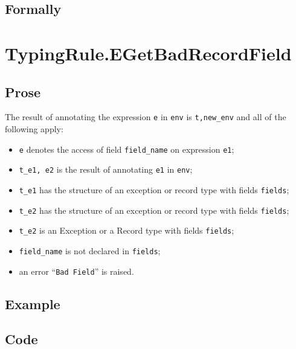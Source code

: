 \documentclass{book}
\begin{document}
\begin{emptyformal}
    \subsection{Formally}
\end{emptyformal}


\section{TypingRule.EGetBadRecordField \label{sec:TypingRule.EGetBadRecordField}}

  \subsection{Prose}
  The result of annotating the expression \texttt{e} in \texttt{env} is
\texttt{t,new\_env} and all of the following apply:
  \begin{itemize}
  \item \texttt{e} denotes the access of field \texttt{field\_name} on expression \texttt{e1};
  \item \texttt{t\_e1, e2} is the result of annotating \texttt{e1} in \texttt{env};
  \item \texttt{t\_e1} has the structure of an exception or record type with fields \texttt{fields};
  \item \texttt{t\_e2} has the structure of an exception or record type with fields \texttt{fields};
  \item \texttt{t\_e2} is an Exception or a Record type with fields \texttt{fields};
  \item \texttt{field\_name} is not declared in \texttt{fields};
  \item an error ``\texttt{Bad Field}'' is raised.
  \end{itemize}

  \subsection{Example}

  \subsection{Code}
\end{document}
